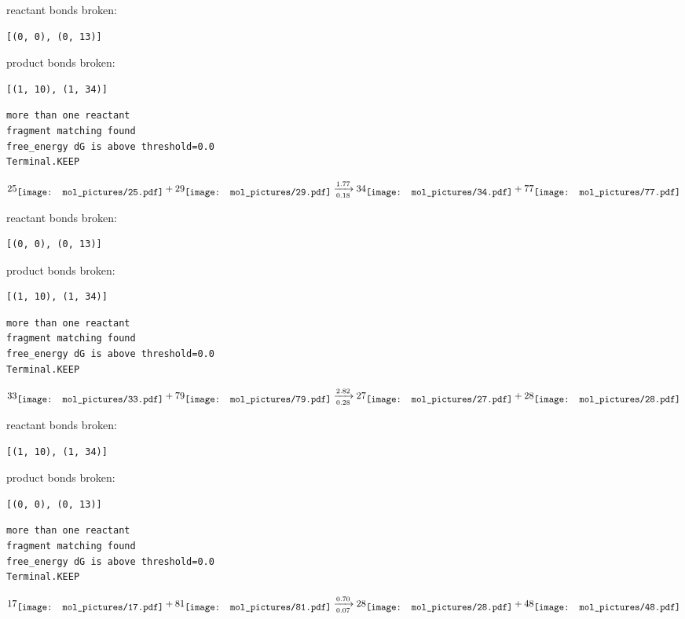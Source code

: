 \documentclass{article}
\begin{document}
reactant bonds broken:\begin{verbatim}
[(0, 0), (0, 13)]
\end{verbatim}
product bonds broken:\begin{verbatim}
[(1, 10), (1, 34)]
\end{verbatim}




\vspace{1cm}
\begin{verbatim}
more than one reactant
fragment matching found
free_energy dG is above threshold=0.0
Terminal.KEEP
\end{verbatim}
$$
25
\raisebox{-.5\height}{\texttt{[image: mol\_pictures/25.pdf]}}
+
29
\raisebox{-.5\height}{\texttt{[image: mol\_pictures/29.pdf]}}
\xrightarrow[0.18]{1.77}
34
\raisebox{-.5\height}{\texttt{[image: mol\_pictures/34.pdf]}}
+
77
\raisebox{-.5\height}{\texttt{[image: mol\_pictures/77.pdf]}}
$$


reactant bonds broken:\begin{verbatim}
[(0, 0), (0, 13)]
\end{verbatim}
product bonds broken:\begin{verbatim}
[(1, 10), (1, 34)]
\end{verbatim}




\vspace{1cm}
\begin{verbatim}
more than one reactant
fragment matching found
free_energy dG is above threshold=0.0
Terminal.KEEP
\end{verbatim}
$$
33
\raisebox{-.5\height}{\texttt{[image: mol\_pictures/33.pdf]}}
+
79
\raisebox{-.5\height}{\texttt{[image: mol\_pictures/79.pdf]}}
\xrightarrow[0.28]{2.82}
27
\raisebox{-.5\height}{\texttt{[image: mol\_pictures/27.pdf]}}
+
28
\raisebox{-.5\height}{\texttt{[image: mol\_pictures/28.pdf]}}
$$


reactant bonds broken:\begin{verbatim}
[(1, 10), (1, 34)]
\end{verbatim}
product bonds broken:\begin{verbatim}
[(0, 0), (0, 13)]
\end{verbatim}




\vspace{1cm}
\begin{verbatim}
more than one reactant
fragment matching found
free_energy dG is above threshold=0.0
Terminal.KEEP
\end{verbatim}
$$
17
\raisebox{-.5\height}{\texttt{[image: mol\_pictures/17.pdf]}}
+
81
\raisebox{-.5\height}{\texttt{[image: mol\_pictures/81.pdf]}}
\xrightarrow[0.07]{0.70}
28
\raisebox{-.5\height}{\texttt{[image: mol\_pictures/28.pdf]}}
+
48
\raisebox{-.5\height}{\texttt{[image: mol\_pictures/48.pdf]}}
$$
\end{document}
